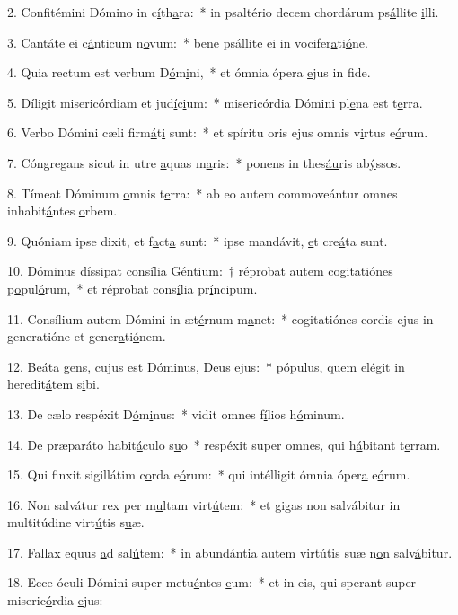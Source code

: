 2. Confitémini Dómino in c\uline{í}th\uline{a}ra:~* in psaltério decem chordárum ps\uline{á}llite \uline{i}lli.\par 
3. Cantáte ei c\uline{á}nticum n\uline{o}vum:~* bene psállite ei in vocifer\uline{a}ti\uline{ó}ne.\par 
4. Quia rectum est verbum D\uline{ó}m\uline{i}ni,~* et ómnia ópera \uline{e}jus in f\uline{i}de.\par 
5. Díligit misericórdiam et jud\uline{í}c\uline{i}um:~* misericórdia Dómini pl\uline{e}na est t\uline{e}rra.\par 
6. Verbo Dómini cæli firm\uline{á}t\uline{i} sunt:~* et spíritu oris ejus omnis v\uline{i}rtus e\uline{ó}rum.\par 
7. Cóngregans sicut in utre \uline{a}quas m\uline{a}ris:~* ponens in thes\uline{áu}ris ab\uline{ý}ssos.\par 
8. Tímeat Dóminum \uline{o}mnis t\uline{e}rra:~* ab eo autem commoveántur omnes inhabit\uline{á}ntes \uline{o}rbem.\par 
9. Quóniam ipse dixit, et f\uline{a}ct\uline{a} sunt:~* ipse mandávit, \uline{e}t cre\uline{á}ta sunt.\par 
10. Dóminus díssipat consília \uline{Gén}tium:~† réprobat autem cogitatiónes p\uline{o}pul\uline{ó}rum,~* et réprobat cons\uline{í}lia pr\uline{í}ncipum.\par 
11. Consílium autem Dómini in æt\uline{é}rnum m\uline{a}net:~* cogitatiónes cordis ejus in generatióne et gener\uline{a}ti\uline{ó}nem.\par 
12. Beáta gens, cujus est Dóminus, D\uline{e}us \uline{e}jus:~* pópulus, quem elégit in heredit\uline{á}tem s\uline{i}bi.\par 
13. De cælo respéxit D\uline{ó}m\uline{i}nus:~* vidit omnes f\uline{í}lios h\uline{ó}minum.\par 
14. De præparáto habit\uline{á}culo s\uline{u}o~* respéxit super omnes, qui h\uline{á}bitant t\uline{e}rram.\par 
15. Qui finxit sigillátim c\uline{o}rda e\uline{ó}rum:~* qui intélligit ómnia óper\uline{a} e\uline{ó}rum.\par 
16. Non salvátur rex per m\uline{u}ltam virt\uline{ú}tem:~* et gigas non salvábitur in multitúdine virt\uline{ú}tis s\uline{u}æ.\par 
17. Fallax equus \uline{a}d sal\uline{ú}tem:~* in abundántia autem virtútis suæ n\uline{o}n salv\uline{á}bitur.\par 
18. Ecce óculi Dómini super metu\uline{é}ntes \uline{e}um:~* et in eis, qui sperant super miseric\uline{ó}rdia \uline{e}jus:\par 
